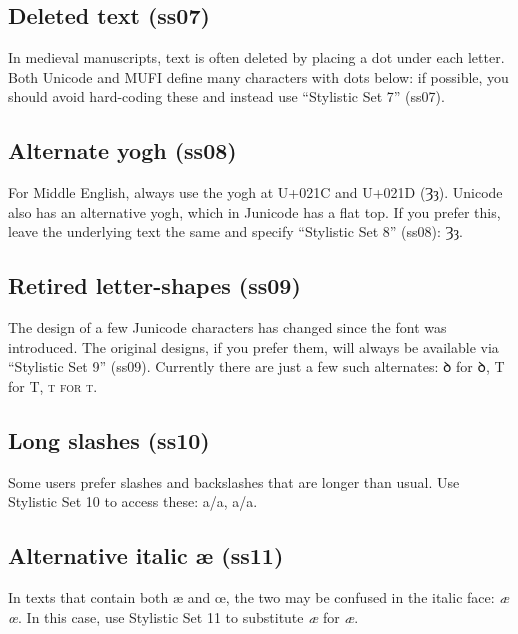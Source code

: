 \documentclass[12pt,a4paper,openany]{book}
\begin{document}
\subsection*{Deleted text (ss07)}

In medieval manuscripts, text is often deleted by placing a dot under each
letter. Both Unicode and MUFI define many characters with dots below:
{ if possible, you should avoid
hard-coding these and instead use} “Stylistic Set 7” (ss07).

\subsection*{Alternate yogh (ss08)}

For Middle English, always use the yogh at U+021C and U+021D (Ȝȝ).
Unicode also has an alternative yogh, which in Junicode has a
flat top. If you prefer this, leave the underlying text the same and
specify “Stylistic Set 8” (ss08):
{ Ȝȝ}.


\subsection*{Retired letter-shapes (ss09)}

The design of a few Junicode characters has changed since the font was
introduced. The original designs, if you prefer them, will always be
available via “Stylistic Set 9” (ss09). Currently there are just a few
such alternates: { ꝺ} for ꝺ,
{ T} for T,
{\scshape{ t} for t}.

\subsection*{Long slashes (ss10)}

Some users prefer slashes and backslashes that are longer than
usual. Use Stylistic Set 10 to access these: a/a, {a/a}.

\subsection*{Alternative italic æ (ss11)}

In texts that contain both æ and œ, the two may be confused in the
italic face: \textit{æ œ}. In this case, use Stylistic Set 11 to
substitute \textit{æ} for \textit{æ}.
\end{document}
